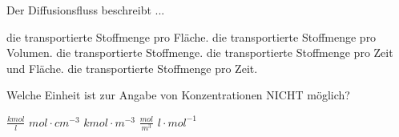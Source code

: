 \documentclass[11pt]{exam}
\begin{document}
\begin{questions}
\vspace{3mm}\question Der Diffusionsfluss beschreibt ...

\begin{choices}
	\choice die transportierte Stoffmenge pro Fläche.
	\choice die transportierte Stoffmenge pro Volumen.
	\choice die transportierte Stoffmenge.
	\choice die transportierte Stoffmenge pro Zeit und Fläche.
	\choice die transportierte Stoffmenge pro Zeit.
\end{choices}

\vspace{3mm}\question Welche Einheit ist zur Angabe von Konzentrationen NICHT möglich?

\begin{choices}
	\choice \( \frac{kmol}{l} \)
	\choice \( mol \cdot cm^{-3} \)
	\choice \( kmol \cdot m^{-3} \)
	\choice \( \frac{mol}{m^3} \)
	\choice \( l \cdot mol^{-1} \)
\end{choices}

\vspace{3mm}\end{questions}
\end{document}
